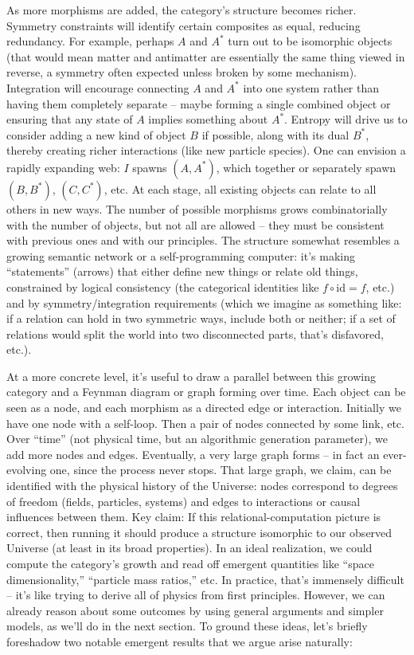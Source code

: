 \documentclass{article}
\begin{document}
As more morphisms are added, the category’s structure becomes richer. Symmetry constraints will identify certain composites as equal, reducing redundancy. For example, perhaps $A$ and $A^*$ turn out to be isomorphic objects (that would mean matter and antimatter are essentially the same thing viewed in reverse, a symmetry often expected unless broken by some mechanism). Integration will encourage connecting $A$ and $A^*$ into one system rather than having them completely separate – maybe forming a single combined object or ensuring that any state of $A$ implies something about $A^*$. Entropy will drive us to consider adding a new kind of object $B$ if possible, along with its dual $B^*$, thereby creating richer interactions (like new particle species). One can envision a rapidly expanding web: $I$ spawns $(A,A^*)$, which together or separately spawn $(B,B^*)$, $(C,C^*)$, etc. At each stage, all existing objects can relate to all others in new ways. The number of possible morphisms grows combinatorially with the number of objects, but not all are allowed – they must be consistent with previous ones and with our principles. The structure somewhat resembles a growing semantic network or a self-programming computer: it’s making “statements” (arrows) that either define new things or relate old things, constrained by logical consistency (the categorical identities like $f \circ \mathrm{id} = f$, etc.) and by symmetry/integration requirements (which we imagine as something like: if a relation can hold in two symmetric ways, include both or neither; if a set of relations would split the world into two disconnected parts, that’s disfavored, etc.).

At a more concrete level, it’s useful to draw a parallel between this growing category and a Feynman diagram or graph forming over time. Each object can be seen as a node, and each morphism as a directed edge or interaction. Initially we have one node with a self-loop. Then a pair of nodes connected by some link, etc. Over “time” (not physical time, but an algorithmic generation parameter), we add more nodes and edges. Eventually, a very large graph forms – in fact an ever-evolving one, since the process never stops. That large graph, we claim, can be identified with the physical history of the Universe: nodes correspond to degrees of freedom (fields, particles, systems) and edges to interactions or causal influences between them. Key claim: If this relational-computation picture is correct, then running it should produce a structure isomorphic to our observed Universe (at least in its broad properties). In an ideal realization, we could compute the category’s growth and read off emergent quantities like “space dimensionality,” “particle mass ratios,” etc. In practice, that’s immensely difficult – it’s like trying to derive all of physics from first principles. However, we can already reason about some outcomes by using general arguments and simpler models, as we’ll do in the next section. To ground these ideas, let’s briefly foreshadow two notable emergent results that we argue arise naturally:
\end{document}
